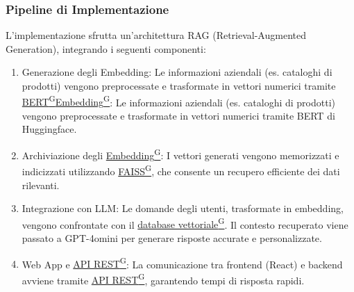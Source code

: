 \subsubsection{Pipeline di Implementazione}
L'implementazione sfrutta un'architettura RAG (Retrieval-Augmented Generation), integrando i seguenti componenti:
\begin{enumerate}
    \item Generazione degli Embedding: Le informazioni aziendali (es. cataloghi di prodotti) vengono preprocessate e trasformate in vettori numerici tramite \href{https://code7crusaders.github.io/docs/RTB/documentazione_interna/glossario.html#bert-bidirectional-encoder-representations-from-transformers}{BERT\textsuperscript{G}}\href{https://code7crusaders.github.io/docs/RTB/documentazione_interna/glossario.html#embedding}{Embedding\textsuperscript{G}}: Le informazioni aziendali (es. cataloghi di prodotti) vengono preprocessate e trasformate in vettori numerici tramite BERT di Huggingface.
    \item Archiviazione degli \href{https://code7crusaders.github.io/docs/RTB/documentazione_interna/glossario.html#embedding}{Embedding\textsuperscript{G}}: I vettori generati vengono memorizzati e indicizzati utilizzando \href{https://code7crusaders.github.io/docs/RTB/documentazione_interna/glossario.html#faiss}{FAISS\textsuperscript{G}}, che consente un recupero efficiente dei dati rilevanti.
    \item Integrazione con LLM: Le domande degli utenti, trasformate in embedding, vengono confrontate con il \href{https://code7crusaders.github.io/docs/RTB/documentazione_interna/glossario.html#database-vettoriale}{database vettoriale\textsuperscript{G}}. Il contesto recuperato viene passato a GPT-4omini per generare risposte accurate e personalizzate.
    \item Web App e \href{https://code7crusaders.github.io/docs/RTB/documentazione_interna/glossario.html#api-rest-representational-state-transfer}{API REST\textsuperscript{G}}: La comunicazione tra frontend (React) e backend avviene tramite \href{https://code7crusaders.github.io/docs/RTB/documentazione_interna/glossario.html#api-rest-representational-state-transfer}{API REST\textsuperscript{G}}, garantendo tempi di risposta rapidi.
\end{enumerate}

